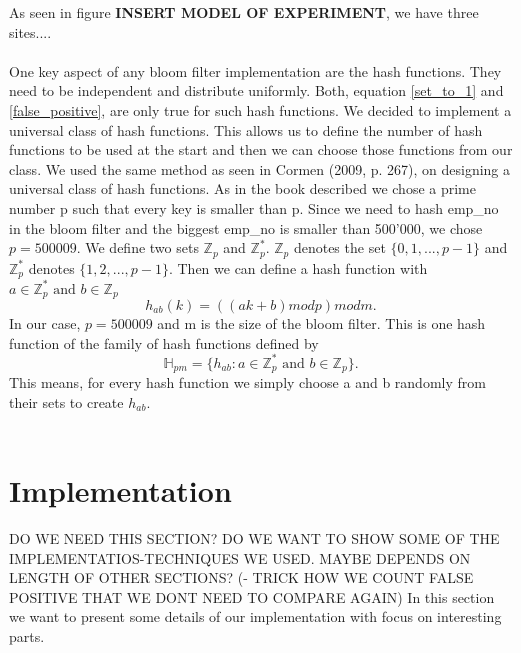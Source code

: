 \documentclass[12]{scrartcl}
\begin{document}
As seen in figure \textbf{INSERT MODEL OF EXPERIMENT}, we have three sites....\\\\

One key aspect of any bloom filter implementation are the hash functions. They need to be independent and distribute uniformly. Both, equation \ref{set_to_1} and \ref{false_positive}, are only true for such hash functions. We decided to implement a universal class of hash functions. This allows us to define the number of hash functions to be used at the start and then we can choose those functions from our class. We used the same method as seen in Cormen (2009, p. 267), on designing a universal class of hash functions. As in the book described we chose a prime number p such that every key is smaller than p. Since we need to hash emp\_no in the bloom filter and the biggest emp\_no is smaller than 500'000, we chose $p = 500009$. We define two sets $\mathbb{Z}_p$ and $\mathbb{Z}_p^*$. $\mathbb{Z}_p$ denotes the set $\{0,1,...,p-1\}$ and $\mathbb{Z}_p^*$ denotes $\{1,2,...,p-1\}$. Then we can define a hash function with $a \in \mathbb{Z}_p^* \text{ and } b \in \mathbb{Z}_p$
\begin{equation}
	h_{ab}(k) = ((ak + b) \mathrel{mod} p) \mathrel{mod} m.
\end{equation}
In our case, $p = 500009$ and m is the size of the bloom filter. This is one hash function of the family of hash functions defined by
\begin{equation}
\mathbb{H}_{pm} = \{h_{ab} \mathrel{:} a \in \mathbb{Z}_p^* \text{ and } b \in \mathbb{Z}_p\}.
\end{equation}
This means, for every hash function we simply choose a and b randomly from their sets to create $h_{ab}$.\\\\

\section{Implementation}
DO WE NEED THIS SECTION? DO WE WANT TO SHOW SOME OF THE IMPLEMENTATIOS-TECHNIQUES WE USED. MAYBE DEPENDS ON LENGTH OF OTHER SECTIONS? (- TRICK HOW WE COUNT FALSE POSITIVE THAT WE DONT NEED TO COMPARE AGAIN)
In this section we want to present some details of our implementation with focus on interesting parts.
\end{document}
